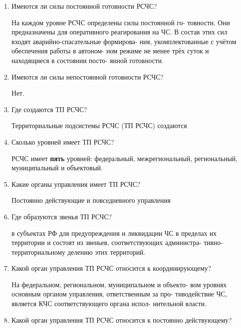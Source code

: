 \documentclass[oneside,final,14pt]{extreport}
\begin{document}
\begin{enumerate}
	\item  Имеются ли силы постоянной готовности РСЧС?
	
	На каждом уровне РСЧС определены силы постоянной го-
	товности. Они предназначены для оперативного реагирования на
	ЧС. В состав этих сил входят аварийно-спасательные формирова-
	ния, укомплектованные с учётом обеспечения работы в автоном-
	ном режиме не менее трёх суток и находящиеся в состоянии посто-
	янной готовности.
	
	\item Имеются ли силы непостоянной готовности РСЧС?
	
	Нет.
	
	\item  Где создаются ТП РСЧС?
	
	Территориальные подсистемы РСЧС (ТП РСЧС) создаются
	
	\item  Сколько уровней имеет ТП РСЧС?
	
	РСЧС имеет \textbf{пять} уровней: федеральный, межрегиональный,
	региональный, муниципальный и объектовый.
	
	\item  Какие органы управления имеет ТП РСЧС?
	
	Постоянно действующие и повседневного управления
	
	\item  Где образуются звенья ТП РСЧС?
	
		в субъектах РФ для предупреждения и ликвидации ЧС в пределах
		их территории и состоят из звеньев, соответствующих администра-
		тивно-территориальному делению этих территорий.
	
	\item  Какой орган управления ТП РСЧС относится к координирующему?
	
	На федеральном, региональном, муниципальном и объекто-
	вом уровнях основным органом управления, ответственным за про-
	тиводействие ЧС, является КЧС соответствующего органа испол-
	нительной власти.
	
	\item  Какой орган управления ТП РСЧС относится к постоянно действующему?
	

\end{enumerate}
\end{document}

